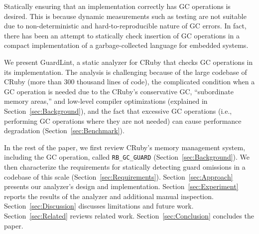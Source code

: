 Statically ensuring that an implementation correctly has GC operations is desired. This is because dynamic measurements such as testing are not suitable due to non-deterministic and hard-to-reproducible nature of GC errors.  In fact, there has been an attempt to statically check insertion of GC operations in a compact implementation of a garbage-collected language for embedded systems\cite{UgawaFujimoto2019PRO}.

We present GuardLint, a static analyzer for CRuby that checks GC operations in its implementation. The analysis is challenging because of the large codebase of CRuby (more than 300 thousand lines of code), the complicated condition when a GC operation is needed due to the CRuby's conservative GC, ``subordinate memory areas,'' and low-level compiler optimizations (explained in Section~\ref{sec:Background}), and the fact that excessive GC operations (i.e., performing GC operations where they are not needed) can cause performance degradation (Section~\ref{sec:Benchmark}).

In the rest of the paper, we first review CRuby's memory management system, including the GC operation, called \texttt{RB\_GC\_GUARD} (Section~\ref{sec:Background}). We then characterize the requirements for statically detecting guard omissions in a codebase of this scale (Section~\ref{sec:Requirements}). Section~\ref{sec:Approach} presents our analyzer's design and implementation. Section~\ref{sec:Experiment} reports the results of the analyzer and additional manual inspection. Section~\ref{sec:Discussion} discusses limitations and future work. Section~\ref{sec:Related} reviews related work. Section~\ref{sec:Conclusion} concludes the paper.
